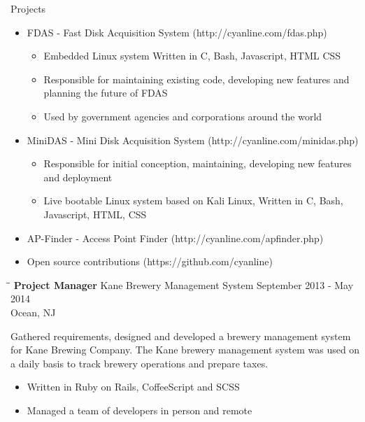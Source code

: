 \documentclass{res}
\begin{document}
\begin{resume}
    Projects
    \begin{itemize}
        \item FDAS - Fast Disk Acquisition System (http://cyanline.com/fdas.php)
        \begin{itemize}
            \item Embedded Linux system Written in C, Bash, Javascript, HTML CSS
            \item Responsible for maintaining existing code, developing new features and planning the future of FDAS
            \item Used by government agencies and corporations around the world
        \end{itemize}
        \item MiniDAS - Mini Disk Acquisition System (http://cyanline.com/minidas.php)
        \begin{itemize}
            \item Responsible for initial conception, maintaining, developing new features and deployment
            \item Live bootable Linux system based on Kali Linux, Written in C, Bash, Javascript, HTML, CSS
        \end{itemize}
        \item AP-Finder - Access Point Finder (http://cyanline.com/apfinder.php)
        \item Open source contributions (https://github.com/cyanline)
    \end{itemize}


   \begin{tabbing}
   \hspace{2.3in}\= \hspace{2.6in}\= \kill %
    {\bf Project Manager} \>Kane Brewery Management System     \>September 2013 - May 2014\\
                             \>Ocean, NJ
   \end{tabbing}\vspace{-20pt}      %
   Gathered requirements, designed and developed a brewery management system for Kane Brewing Company. The Kane brewery management system was used on a daily basis to track brewery operations and prepare taxes.

    \begin{itemize}
        \item Written in Ruby on Rails, CoffeeScript and SCSS
        \item Managed a team of developers in person and remote
    \end{itemize}



\end{resume}
\end{document}
